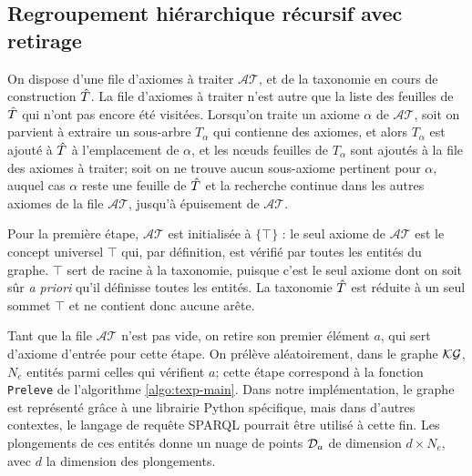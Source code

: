 \subsection{Regroupement hiérarchique récursif avec retirage}





On dispose d'une file d'axiomes à traiter $\mathcal{AT}$, et de la taxonomie en cours de construction $\Tpred$. La file d'axiomes à traiter n'est autre que la liste des feuilles de $\Tpred$ qui n'ont pas encore été visitées. Lorsqu'on traite un axiome $\alpha$ de $\mathcal{AT}$, soit on parvient à extraire un sous-arbre $T_\alpha$ qui contienne des axiomes, et alors $T_\alpha$ est ajouté à $\Tpred$ à l'emplacement de $\alpha$, et les nœuds feuilles de $T_\alpha$ sont ajoutés à la file des axiomes à traiter; soit on ne trouve aucun sous-axiome pertinent pour $\alpha$, auquel cas $\alpha$ reste une feuille de $\Tpred$ et la recherche continue dans les autres axiomes de la file $\mathcal{AT}$, jusqu'à épuisement de $\mathcal{AT}$.

Pour la première étape, $\mathcal{AT}$ est initialisée à $\{\top\}$ : le seul axiome de $\mathcal{AT}$ est le concept universel $\top$ qui, par définition, est vérifié par toutes les entités du graphe. $\top$ sert de racine à la taxonomie, puisque c'est le seul axiome dont on soit sûr \textit{a priori} qu'il définisse toutes les entités.
La taxonomie $\Tpred$ est réduite à un seul sommet $\top$ et ne contient donc aucune arête. 

Tant que la file $\mathcal{AT}$ n'est pas vide, on retire son premier élément $a$, qui sert d'axiome d'entrée pour cette étape. On prélève aléatoirement, dans le graphe $\KG$, $N_e$ entités parmi celles qui vérifient $a$; cette étape correspond à la fonction \texttt{Preleve} de l'algorithme \ref{algo:texp-main}. Dans notre implémentation, le graphe est représenté grâce à une librairie Python spécifique, mais dans d'autres contextes, le langage de requête SPARQL pourrait être utilisé à cette fin. Les plongements de ces entités donne un nuage de points $\cal{D}_a$ de dimension $d \times N_e$, avec $d$ la dimension des plongements.

